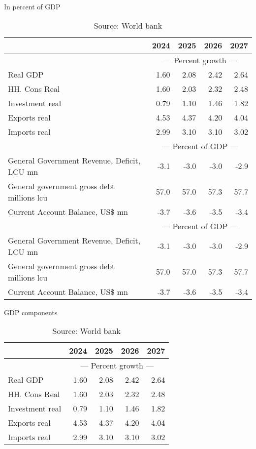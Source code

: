 \documentclass{article}
\begin{document}
\begin{table}[ht]
\caption{In percent of GDP }
\begin{tabular}{lrrrr}
\toprule
 & 2024 & 2025 & 2026 & 2027 \\
\midrule
&\multicolumn{4}{c}{{---  Percent growth ---}}                     \\
Real GDP & 1.60 & 2.08 & 2.42 & 2.64 \\
HH. Cons Real & 1.60 & 2.03 & 2.32 & 2.48 \\
Investment real & 0.79 & 1.10 & 1.46 & 1.82 \\
Exports real & 4.53 & 4.37 & 4.20 & 4.04 \\
Imports real & 2.99 & 3.10 & 3.10 & 3.02 \\
&\multicolumn{4}{c}{{---  Percent of GDP ---}}                     \\
General Government Revenue, Deficit, LCU mn & -3.1 & -3.0 & -3.0 & -2.9 \\
General government gross debt millions lcu & 57.0 & 57.0 & 57.3 & 57.7 \\
Current Account Balance, US\$ mn & -3.7 & -3.6 & -3.5 & -3.4 \\
&\multicolumn{4}{c}{{---  Percent of GDP ---}}                     \\
General Government Revenue, Deficit, LCU mn & -3.1 & -3.0 & -3.0 & -2.9 \\
General government gross debt millions lcu & 57.0 & 57.0 & 57.3 & 57.7 \\
Current Account Balance, US\$ mn & -3.7 & -3.6 & -3.5 & -3.4 \\
\bottomrule
\end{tabular}
\caption*{Source: World bank }
\end{table}

\begin{table}[ht]
\caption{GDP components}
\begin{tabular}{lrrrr}
\toprule
 & 2024 & 2025 & 2026 & 2027 \\
\midrule
&\multicolumn{4}{c}{{---  Percent growth ---}}                     \\
Real GDP & 1.60 & 2.08 & 2.42 & 2.64 \\
HH. Cons Real & 1.60 & 2.03 & 2.32 & 2.48 \\
Investment real & 0.79 & 1.10 & 1.46 & 1.82 \\
Exports real & 4.53 & 4.37 & 4.20 & 4.04 \\
Imports real & 2.99 & 3.10 & 3.10 & 3.02 \\
\bottomrule
\end{tabular}
\caption*{Source: World bank }
\end{table}
\end{document}
